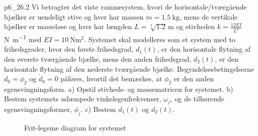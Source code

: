 
\begin{problemwithimage}{p6_2}{6.2}
  Vi betragter det viste rammesystem, hvori de horisontale/tværgående bjælker er uendeligt stive og hver har massen $m = \qty{1,5}{\kg}$, mens de vertikale bjælker er masseløse og hver har længden $L = \sqrt[3]{\num{1,2}} \, \unit{\m}$ og stivheden $k = \frac{12 EI}{L^3}$ \, \unit{\N\per\m} med $EI = \qty{10}{\N\m\squared}$.
  Systemet skal modelleres som et system med to frihedsgrader, hvor den første frihedsgrad, $d_1(t)$, er den horisontale flytning af den øverste tværgående bjælke, mens den anden frihedsgrad, $d_2(t)$, er den horisontale flytning af den nederste tværgående bjælke.
  Begyndelsesbetingelserne $d_0 = \phi_2$ og $\dot{d}_0 = 0$ påføres, hvortil det bemærkes, at $\phi_2$ er den anden egensvingningsform.
  a) Opstil stivheds- og massematricen for systemet.
  b) Bestem systemets udæmpede vinkelegenfrekvenser, $\omega_j$, og de tilhørende egensvingningsformer, $\phi_j$.
  c) Bestem $d_1(t)$ og $d_2(t)$.
\end{problemwithimage}

\begin{figure}[ht]
    \centering
    \caption{Frit-legeme diagram for systemet}
    \label{fig:p6_2fbd}
\end{figure}

